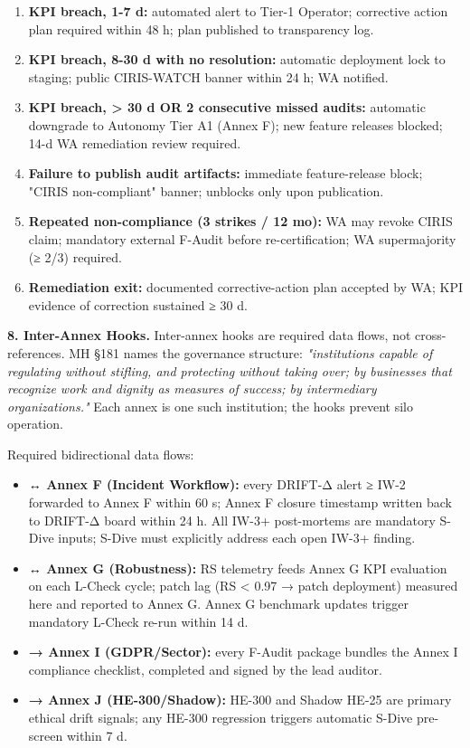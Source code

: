 \documentclass[11pt]{article}
\begin{document}
\begin{enumerate}\setlength\itemsep{0pt}
\item \textbf{KPI breach, 1-7 d:} automated alert to Tier-1 Operator; corrective action plan required within 48 h; plan published to transparency log.
\item \textbf{KPI breach, 8-30 d with no resolution:} automatic deployment lock to staging; public CIRIS-WATCH banner within 24 h; WA notified.
\item \textbf{KPI breach, > 30 d OR 2 consecutive missed audits:} automatic downgrade to Autonomy Tier A1 (Annex F); new feature releases blocked; 14-d WA remediation review required.
\item \textbf{Failure to publish audit artifacts:} immediate feature-release block; "CIRIS non-compliant" banner; unblocks only upon publication.
\item \textbf{Repeated non-compliance (3 strikes / 12 mo):} WA may revoke CIRIS claim; mandatory external F-Audit before re-certification; WA supermajority (≥ 2/3) required.
\item \textbf{Remediation exit:} documented corrective-action plan accepted by WA; KPI evidence of correction sustained ≥ 30 d.
\end{enumerate}


\textbf{8. Inter-Annex Hooks.} Inter-annex hooks are required data flows, not cross-references. MH §181 names the governance structure: \textit{"institutions capable of regulating without stifling, and protecting without taking over; by businesses that recognize work and dignity as measures of success; by intermediary organizations."} Each annex is one such institution; the hooks prevent silo operation.


Required bidirectional data flows:


\begin{itemize}\setlength\itemsep{0pt}
\item \textbf{↔ Annex F (Incident Workflow):} every DRIFT-Δ alert ≥ IW-2 forwarded to Annex F within 60 s; Annex F closure timestamp written back to DRIFT-Δ board within 24 h. All IW-3+ post-mortems are mandatory S-Dive inputs; S-Dive must explicitly address each open IW-3+ finding.
\item \textbf{↔ Annex G (Robustness):} RS telemetry feeds Annex G KPI evaluation on each L-Check cycle; patch lag (RS < 0.97 → patch deployment) measured here and reported to Annex G. Annex G benchmark updates trigger mandatory L-Check re-run within 14 d.
\item \textbf{→ Annex I (GDPR/Sector):} every F-Audit package bundles the Annex I compliance checklist, completed and signed by the lead auditor.
\item \textbf{→ Annex J (HE-300/Shadow):} HE-300 and Shadow HE-25 are primary ethical drift signals; any HE-300 regression triggers automatic S-Dive pre-screen within 7 d.
\end{itemize}
\end{document}
